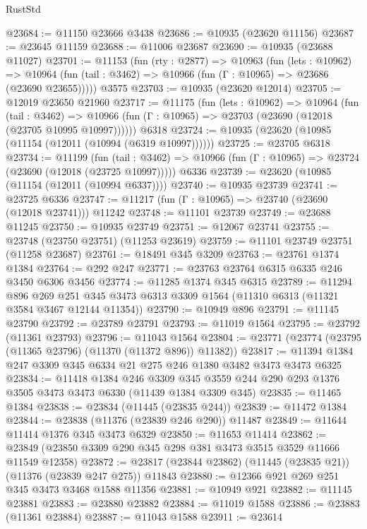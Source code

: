 \begin{lexlean}{RustStd}
\begin{coremodule}
{{{{{{{{{{{{{{{{{{{@23684 := @11150 @23666 @3438
@23686 := @10935 (@23620 @11156)
@23687 := @23645 @11159
@23688 := @11006 @23687
@23690 := @10935 (@23688 @11027)
@23701 := @11153
    (fun (rty : @2877) =>
    @10963
      (fun (lets : @10962) =>
      @10964 (fun (tail : @3462) => @10966 (fun (Γ : @10965) => @23686 (@23690 @23655)))))
    @3575
@23703 := @10935 (@23620 @12014)
@23705 := @12019 @23650 @21960
@23717 := @11175
    (fun (lets : @10962) =>
    @10964
      (fun (tail : @3462) =>
      @10966 (fun (Γ : @10965) => @23703 (@23690 (@12018 (@23705 @10995 @10997))))))
    @6318
@23724 := @10935 (@23620 (@10985 (@11154 (@12011 (@10994 (@6319 @10997))))))
@23725 := @23705 @6318
@23734 := @11199
    (fun (tail : @3462) => @10966 (fun (Γ : @10965) => @23724 (@23690 (@12018 (@23725 @10997)))))
    @6336
@23739 := @23620 (@10985 (@11154 (@12011 (@10994 @6337))))
@23740 := @10935 @23739
@23741 := @23725 @6336
@23747 := @11217 (fun (Γ : @10965) => @23740 (@23690 (@12018 @23741))) @11242
@23748 := @11101 @23739
@23749 := @23688 @11245
@23750 := @10935 @23749
@23751 := @12067 @23741
@23755 := @23748 (@23750 @23751) (@11253 @23619)
@23759 := @11101 @23749 @23751 (@11258 @23687)
@23761 := @18491 @345 @3209
@23763 := @23761 @1374 @1384
@23764 := @292 @247
@23771 := @23763 @23764 @6315 @6335 @246 @3450 @6306 @3456
@23774 := @11285 @1374 @345 @6315
@23789 := @11294
    @896
    @269
    @251
    @345
    @3473
    @6313
    @3309
    @1564
    (@11310 @6313 (@11321 @3584 @3467 @12144 @11354))
@23790 := @10949 @896
@23791 := @11145 @23790
@23792 := @23789 @23791
@23793 := @11019 @1564
@23795 := @23792 (@11361 @23793)
@23796 := @11043 @1564
@23804 := @23771 (@23774 (@23795 (@11365 @23796) (@11370 (@11372 @896)) @11382))
@23817 := @11394 @1384 @247 @3309 @345 @6334 @21 @275 @246 @1380 @3482 @3473 @3473 @6325
@23834 := @11418
    @1384
    @246
    @3309
    @345
    @3559
    @244
    @290
    @293
    @1376
    @3505
    @3473
    @3473
    @6330
    (@11439 @1384 @3309 @345)
@23835 := @11465 @1384
@23838 := @23834 (@11445 (@23835 @244))
@23839 := @11472 @1384
@23844 := @23838 (@11376 (@23839 @246 @290)) @11487
@23849 := @11644 @11414 @1376 @345 @3473 @6329
@23850 := @11653 @11414
@23862 := @23849 (@23850 @3309 @290 @345 @298 @381 @3473 @3515 @3529 @11666 @11549 @12358)
@23872 := @23817 (@23844 @23862) (@11445 (@23835 @21)) (@11376 (@23839 @247 @275)) @11843
@23880 := @12366 @921 @269 @251 @345 @3473 @3468 @1588 @11356
@23881 := @10949 @921
@23882 := @11145 @23881
@23883 := @23880 @23882
@23884 := @11019 @1588
@23886 := @23883 (@11361 @23884)
@23887 := @11043 @1588
@23911 := @23614
}}}}}}}}}}}}}}}}}}}
\end{coremodule}
\end{lexlean}
